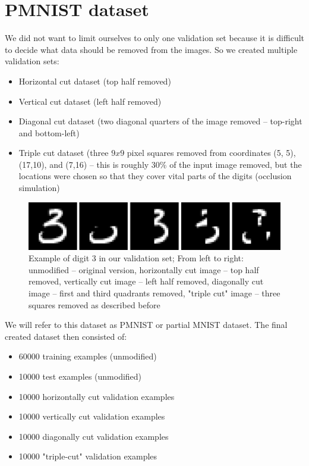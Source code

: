 \documentclass[b5paper]{book}
\begin{document}
\section{PMNIST dataset}

We did not want to limit ourselves to only one validation set because it is difficult to decide what data should be removed from the images. So we created multiple validation sets:

\begin{itemize}
  \item Horizontal cut dataset (top half removed) 
  \item Vertical cut dataset (left half removed)
  \item Diagonal cut dataset (two diagonal quarters of the image removed -- top-right and bottom-left)
  \item Triple cut dataset (three \(9x9\) pixel squares removed from coordinates (5, 5), (17,10), and (7,16) -- this is roughly 30\% of the input image removed, but the locations were chosen so that they cover vital parts of the digits (occlusion simulation)
\end{itemize}

\begin{figure}[!ht]
  \centering
  \includegraphics[scale=0.5, trim=0pt 0pt 0pt 0pt, clip]{datasetimages} 
  \caption{Example of digit 3 in our validation set; From left to right: unmodified -- original version, horizontally cut image -- top half removed, vertically cut image -- left half removed, diagonally cut image -- first and third quadrants removed, "triple cut" image -- three squares removed as described before}
  \label{fig:dsexamples}
\end{figure}

We will refer to this dataset as PMNIST or partial MNIST dataset. The final created dataset then consisted of:

\begin{itemize}
  \item 60000 training examples (unmodified)
  \item 10000 test examples (unmodified) 
  \item 10000 horizontally cut validation examples  
  \item 10000 vertically cut validation examples 
  \item 10000 diagonally cut validation examples
  \item 10000 "triple-cut" validation examples 
\end{itemize}
\end{document}
